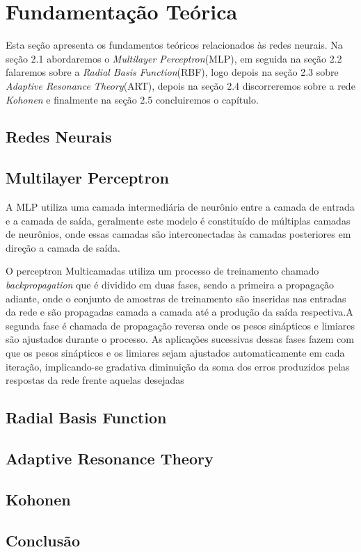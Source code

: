 \chapter{Fundamentação Teórica}
\label{cap:fundamentacao-teorica}

Esta seção apresenta os fundamentos teóricos relacionados às redes
neurais. Na seção 2.1 abordaremos o \textit{Multilayer Perceptron}(MLP), em seguida na seção 2.2 falaremos sobre a \textit{Radial Basis Function}(RBF), logo depois na seção 2.3 sobre \textit{Adaptive Resonance Theory}(ART), depois na seção 2.4 discorreremos sobre a rede \textit{Kohonen} e finalmente na seção 2.5 concluiremos o capítulo.

\section{Redes Neurais}
\label{sec:redes-neurais}



\section{Multilayer Perceptron}
\label{sec:multilayer-perceptron}

A MLP utiliza uma camada intermediária de neurônio entre a camada de entrada e a camada de saída, geralmente este modelo é constituído de múltiplas camadas de neurônios, onde essas camadas são interconectadas às camadas posteriores em direção a camada de saída. 

O perceptron Multicamadas utiliza um processo de treinamento chamado \textit{backpropagation} que é dividido em duas fases, sendo a primeira a propagação adiante, onde o conjunto de amostras de treinamento são inseridas nas entradas da rede e são propagadas camada a camada até a produção da saída respectiva.A segunda fase é chamada de propagação reversa onde os pesos sinápticos e limiares são ajustados durante o processo.
 As aplicações sucessivas dessas fases fazem com que os pesos sinápticos e os limiares sejam ajustados automaticamente em cada iteração, implicando-se gradativa diminuição da soma dos erros produzidos pelas respostas da rede frente aquelas desejadas





\section{Radial Basis Function}
\label{sec:radial-basis-function}

\section{Adaptive Resonance Theory}
\label{sec:adaptive-resonance-theory}


\section{Kohonen}
\label{sec:kohonen}


\section{Conclusão}
\label{sec:conclusão}
